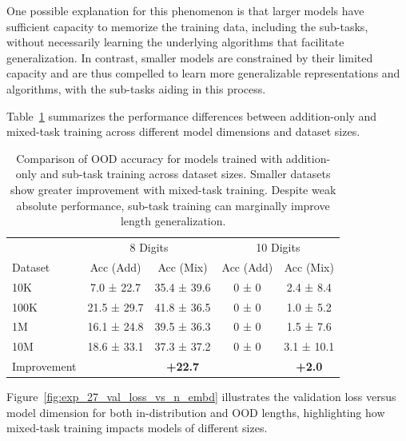 One possible explanation for this phenomenon is that larger models have sufficient capacity to memorize the training data, including the sub-tasks, without necessarily learning the underlying algorithms that facilitate generalization. In contrast, smaller models are constrained by their limited capacity and are thus compelled to learn more generalizable representations and algorithms, with the sub-tasks aiding in this process.

Table~\ref{tab:subtask_results} summarizes the performance differences between addition-only and mixed-task training across different model dimensions and dataset sizes.

\begin{table}[h!]
    \centering
    \caption{Comparison of OOD accuracy for models trained with addition-only and sub-task training across dataset sizes. Smaller datasets show greater improvement with mixed-task training. Despite weak absolute performance, sub-task training can marginally improve length generalization.}

    \label{tab:subtask_results}
    \begin{tabular}{lcccc}
                    & \multicolumn{2}{c}{8 Digits} & \multicolumn{2}{c}{10 Digits}                             \\
        Dataset     & Acc (Add)                    & Acc (Mix)                     & Acc (Add) & Acc (Mix)     \\
        \midrule
        10K         & 7.0 ± 22.7                   & 35.4 ± 39.6                   & 0 ± 0     & 2.4 ± 8.4     \\
        100K        & 21.5 ± 29.7                  & 41.8 ± 36.5                   & 0 ± 0     & 1.0 ± 5.2     \\
        1M          & 16.1 ± 24.8                  & 39.5 ± 36.3                   & 0 ± 0     & 1.5 ± 7.6     \\
        10M         & 18.6 ± 33.1                  & 37.3 ± 37.2                   & 0 ± 0     & 3.1 ± 10.1    \\
        \midrule
        Improvement &                              & \textbf{+22.7}                &           & \textbf{+2.0} \\
        \bottomrule
    \end{tabular}

\end{table}

Figure~\ref{fig:exp_27_val_loss_vs_n_embd} illustrates the validation loss versus model dimension for both in-distribution and OOD lengths, highlighting how mixed-task training impacts models of different sizes.

